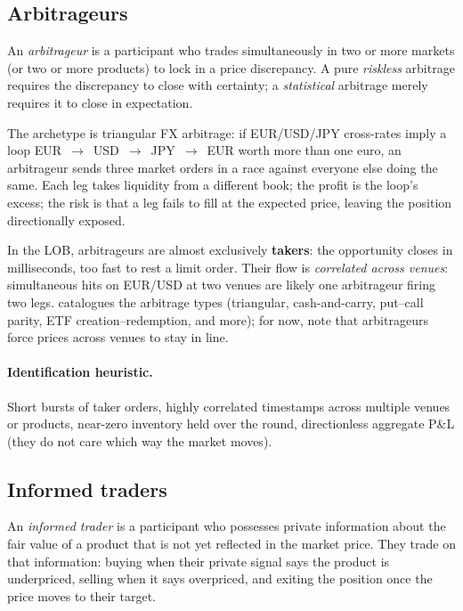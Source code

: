 \subsection{Arbitrageurs}
\label{subsec:arb}

\begin{definition}[Arbitrageur]
An \emph{arbitrageur} is a participant who trades simultaneously in
two or more markets (or two or more products) to lock in a price
discrepancy. A pure \emph{riskless} arbitrage requires the discrepancy
to close with certainty; a \emph{statistical} arbitrage merely
requires it to close in expectation.
\end{definition}

The archetype is triangular FX arbitrage: if EUR/USD/JPY cross-rates
imply a loop EUR~$\to$~USD~$\to$~JPY~$\to$~EUR worth more than one
euro, an arbitrageur sends three market orders in a race against
everyone else doing the same. Each leg takes liquidity from a
different book; the profit is the loop's excess; the risk is that a
leg fails to fill at the expected price, leaving the position
directionally exposed.

In the LOB, arbitrageurs are almost exclusively \textbf{takers}: the
opportunity closes in milliseconds, too fast to rest a limit order.
Their flow is \emph{correlated across venues}: simultaneous hits on
EUR/USD at two venues are likely one arbitrageur firing two legs.
 catalogues the arbitrage types (triangular,
cash-and-carry, put--call parity, ETF creation--redemption, and more);
for now, note that arbitrageurs force prices across venues to stay in
line.

\paragraph{Identification heuristic.} Short bursts of taker orders,
highly correlated timestamps across multiple venues or products,
near-zero inventory held over the round, directionless aggregate P\&L
(they do not care which way the market moves).

\subsection{Informed traders}
\label{subsec:informed}

\begin{definition}
An \emph{informed trader} is a participant who possesses private
information about the fair value of a product that is not yet
reflected in the market price. They trade on that information: buying
when their private signal says the product is underpriced, selling
when it says overpriced, and exiting the position once the price moves
to their target.
\end{definition}

